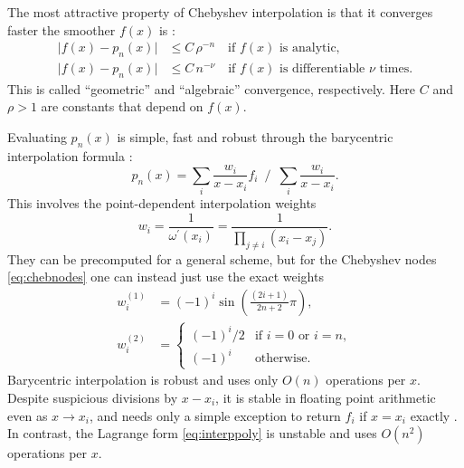 \documentclass{aa}
\begin{document}
The most attractive property of Chebyshev interpolation is that it converges faster the smoother $f(x)$ is \citep{trefethenSixMythsPolynomial}:
\begin{subequations}
\begin{align}
	\big\lvert f(x) - p_n(x) \big\rvert &\leq C \, \rho^{-n} \quad \text{if $f(x)$ is analytic,} \label{eq:geometric} \\
	\big\lvert f(x) - p_n(x) \big\rvert &\leq C \, n^{-\nu} \quad \text{if $f(x)$ is differentiable $\nu$ times.} \label{eq:algebraic}
\end{align}
\label{eq:convergence}%
\end{subequations}
This is called \enquote{geometric} and \enquote{algebraic} convergence, respectively.
Here $C$ and $\rho > 1$ are constants that depend on $f(x)$.

Evaluating $p_n(x)$ is simple, fast and robust through the barycentric interpolation formula \citep{berrutBarycentricLagrangeInterpolation2004}:%
\begin{equation}
	p_n(x) = \sum_i \frac{w_i}{x-x_i} f_i \,\,\,\Bigg/\,\,\, \sum_i \frac{w_i}{x-x_i}.
\label{eq:bary}
\end{equation}
This involves the point-dependent interpolation weights
\begin{equation}
	w_i = \frac{1}{\omega^\prime(x_i)} = \frac{1}{\prod_{j \neq i} (x_i - x_j)}.
\label{eq:weights}
\end{equation}
They can be precomputed for a general scheme,
but for the Chebyshev nodes \eqref{eq:chebnodes} one can instead just use the exact weights%
\begin{subequations}
\begin{align}
	w_i^{(1)} &= (-1)^i \sin \left( \frac{(2i+1)}{2n+2} \pi \right), \label{eq:chebweights1} \\
	w_i^{(2)} &= \begin{cases} (-1)^i/2 & \text{if } i = 0 \text{ or } i = n, \\ (-1)^i & \text{otherwise}. \end{cases} \label{eq:chebweights2}
\end{align}
\label{eq:chebweights}%
\end{subequations}
Barycentric interpolation is robust and uses only $O(n)$ operations per $x$.
Despite suspicious divisions by $x-x_i$, it is stable in floating point arithmetic even as $x \rightarrow x_i$,
and needs only a simple exception to return $f_i$ if $x = x_i$ exactly \citep{highamNumericalStabilityBarycentric2004}.
In contrast, the Lagrange form \eqref{eq:interppoly} is unstable and uses $O(n^2)$ operations per $x$.
\end{document}
